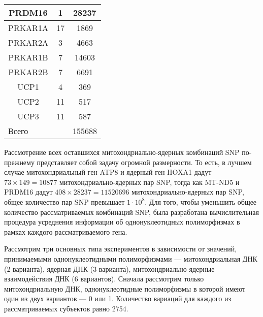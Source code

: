 \begin{table} [htbp]
\begin{threeparttable}
\begin{SingleSpace}
\begin{tabular}{| c | c | c |}
				PRDM16        & 1                   & 28237          \\ \hline
				PRKAR1A       & 17                  & 1869           \\ \hline
				PRKAR2A       & 3                   & 4663           \\ \hline
				PRKAR1B       & 7                   & 14603          \\ \hline
				PRKAR2B       & 7                   & 6691           \\ \hline
				UCP1          & 4                   & 369            \\ \hline
				UCP2          & 11                  & 517            \\ \hline
				UCP3          & 11                  & 587            \\ \hline
				\multicolumn{2}{|l|}{Всего} 		& 155688	     \\ \hline
			\end{tabular}%
		\end{SingleSpace}
	\end{threeparttable}
\end{table}

Рассмотрение всех оставшихся митохондриально-ядерных комбинаций SNP по-прежнему представляет собой задачу огромной размерности. То есть, в лучшем случае митохондриальный ген ATP8 и ядерный ген HOXA1 дадут $73 \times 149 = 10877$ митохондриально-ядерных пар SNP, тогда как MT-ND5 и PRDM16 дадут $408 \times 28237 = 11520696$ митохондриально-ядерных пар SNP, общее количество пар SNP превышает $1 \cdot 10^{8}$. Для того, чтобы уменьшить общее количество рассматриваемых комбинаций SNP, была разработана вычислительная процедура усреднения информации об однонуклеотидных полиморфизмах в рамках каждого рассматриваемого гена.

Рассмотрим три основных типа экспериментов в зависимости от значений, принимаемыми однонуклеотидными полиморфизмами --- митохондриальная ДНК (2 варианта), ядерная ДНК (3 варианта), митохондриально-ядерные взаимодействия ДНК (6 вариантов). Сначала рассмотрим только митохондриальную ДНК, однонуклеотидные полиморфизмы в которой имеют один из двух вариантов --- 0 или 1. Количество вариаций для каждого из рассматриваемых субъектов равно 2754.

